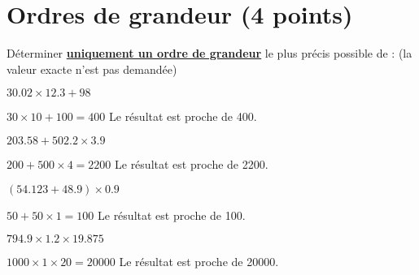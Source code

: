\section{Ordres de grandeur (4 points)}

Déterminer \textbf{\underline{uniquement un ordre de grandeur}} le plus précis possible de : (la valeur exacte n'est pas demandée)

\begin{questions}
	\question[1] $\num{30.02} \times \num{12.3} + 98$
	\begin{solution}
		$\num{30}	\times 10 + 100 = 400	$
		Le résultat est proche de 400.
	\end{solution}
	\question[1] $\num{203.58} + \num{502.2} \times \num{3.9}$
	\begin{solution}
		$\num{200}	+ 500 \times 4 = 2200	$
		Le résultat est proche de 2200.
	\end{solution}
	\question[1] $(\num{54.123} + \num{48.9}) \times \num{0.9}$
	\begin{solution}
		$\num{50}	+ 50 \times 1 = 100	$
		Le résultat est proche de 100.
	\end{solution}

	\question[1] $\num{794.9} \times \num{1.2} \times \num{19.875}$
	\begin{solution}
		$\num{1000}	\times 1 \times 20 = \num{20000}	$
		Le résultat est proche de \num{20000}.
	\end{solution}
\end{questions}